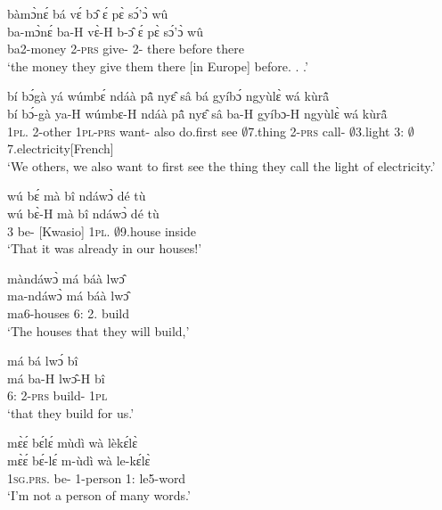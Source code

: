 \begin{exe}[(C234)]
\exC\label{157} 
  \glll  bàmɔ̀nɛ́ bá vɛ́ bɔ̂ ɛ́ pɛ̀ sɔ́'ɔ̀ wû \\
        ba-mɔ̀nɛ́ ba-H vɛ̀-H b-ɔ̂ ɛ́ pɛ̀ sɔ́'ɔ̀ wû \\
          ba2-money 2-\textsc{prs} give-{\R} 2-{\OBJ} {\LOC} there before there  \\
    \trans `the money they give them there [in Europe] before. . .'
 
\exC\label{158} 
  \glll  bí bɔ́gà yá wúmbɛ́ ndáà pã̂ nyɛ̂ sâ bá gyíbɔ́ ngyùlɛ̀ wá kùrã̂ \\
         bí bɔ́-gà ya-H wúmbɛ-H ndáà pã̂ nyɛ̂ sâ ba-H gyíbɔ-H ngyùlɛ̀ wá kùrã̂ \\
          1\textsc{pl}.{\SBJ}  2-other 1\textsc{pl}-\textsc{prs} want-{\R} also do.first see $\emptyset$7.thing 2-\textsc{prs} call-{\R} $\emptyset$3.light 3:{\ATT}  $\emptyset$7.electricity[French]  \\
    \trans `We others, we also want to first see the thing they call the light of electricity.'
 
\exC\label{159}
  \glll  wú bɛ́ mà bî ndáwɔ̀ dé tù \\
         wú bɛ̀-H mà bî ndáwɔ̀ dé tù \\
         3 be-{\R} {\COMPL}[Kwasio] 1\textsc{pl}.{\OBJ} $\emptyset$9.house {\LOC} inside   \\
    \trans `That it was already in our houses!'
 
\exC\label{160} 
  \glll   màndáwɔ̀ má báà lwɔ̂ \\
          ma-ndáwɔ̀ má báà lwɔ̂ \\
          ma6-houses 6:{\ATT}  2.{\FUT} build  \\
    \trans `The houses that they will build,'
 
\exC\label{161} 
  \glll má bá lwɔ́ bî \\
         má ba-H lwɔ̂-H bî \\
          6:{\ATT}  2-\textsc{prs} build-{\R} 1\textsc{pl}  \\
    \trans `that they build for us.'
 
\exC\label{162}
  \glll  mɛ̀ɛ́ bɛ́lɛ́ mùdì wà lèkɛ́lɛ̀ \\
         mɛ̀ɛ́ bɛ́-lɛ́ m-ùdì wà le-kɛ́lɛ̀ \\
          1\textsc{sg}.\textsc{prs}.{\NEG} be-{\NEG} {\N}1-person 1:{\ATT}  le5-word  \\
    \trans `I'm not a person of many words.'
\end{exe}

